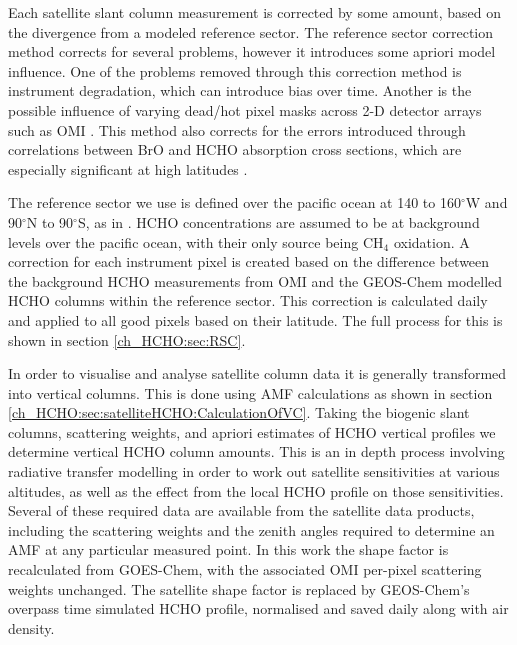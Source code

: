     Each satellite slant column measurement is corrected by some amount, based on the divergence from a modeled reference sector.
    The reference sector correction method corrects for several problems, however it introduces some apriori model influence.
    One of the problems removed through this correction method is instrument degradation, which can introduce bias over time.
    Another is the possible influence of varying dead/hot pixel masks across 2-D detector arrays such as OMI \citep{DeSmedt2015}.
    This method also corrects for the errors introduced through correlations between BrO and HCHO absorption cross sections, which are especially significant at high latitudes \citep{Abad2015}.
    
    The reference sector we use is defined over the pacific ocean at 140 to 160$^{\circ}$W and 90$^{\circ}$N to 90$^{\circ}$S, as in \citet{Abad2015}.
    HCHO concentrations are assumed to be at background levels over the pacific ocean, with their only source being CH$_4$ oxidation.
    A correction for each instrument pixel is created based on the difference between the background HCHO measurements from OMI and the GEOS-Chem modelled HCHO columns within the reference sector.
    This correction is calculated daily and applied to all good pixels based on their latitude.
    The full process for this is shown in section \ref{ch_HCHO:sec:RSC}.
    
    In order to visualise and analyse satellite column data it is generally transformed into vertical columns. 
    This is done using AMF calculations as shown in section \ref{ch_HCHO:sec:satelliteHCHO:CalculationOfVC}.
    Taking the biogenic slant columns, scattering weights, and apriori estimates of HCHO vertical profiles we determine vertical HCHO column amounts.
    This is an in depth process involving radiative transfer modelling in order to work out satellite sensitivities at various altitudes, as well as the effect from the local HCHO profile on those sensitivities.
    Several of these required data are available from the satellite data products, including the scattering weights and the zenith angles required to determine an AMF at any particular measured point.
    In this work the shape factor is recalculated from GOES-Chem, with the associated OMI per-pixel scattering weights unchanged. 
    The satellite shape factor is replaced by GEOS-Chem's overpass time simulated HCHO profile, normalised and saved daily along with air density.
    
